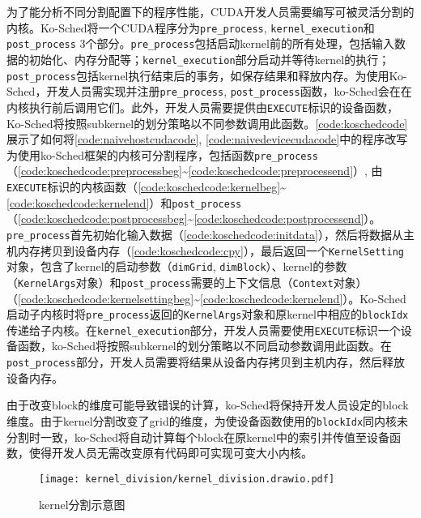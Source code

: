 为了能分析不同分割配置下的程序性能，CUDA开发人员需要编写可被灵活分割的内核。Ko-Sched将一个CUDA程序分为\texttt{pre\_process}, \texttt{kernel\_execution}和\texttt{post\_process} 3个部分。\texttt{pre\_process}包括启动kernel前的所有处理，包括输入数据的初始化、内存分配等；\texttt{kernel\_execution}部分启动并等待kernel的执行；\texttt{post\_process}包括kernel执行结束后的事务，如保存结果和释放内存。为使用Ko-Sched，开发人员需实现并注册\texttt{pre\_process}, \texttt{post\_process}函数，ko-Sched会在在内核执行前后调用它们。此外，开发人员需要提供由\texttt{EXECUTE}标识的设备函数，Ko-Sched将按照subkernel的划分策略以不同参数调用此函数。\autoref{code:koschedcode}展示了如何将\autoref{code:naivehostcudacode}, \autoref{code:naivedevicecudacode}中的程序改写为使用ko-Sched框架的内核可分割程序，包括函数\texttt{pre\_process}（\autoref{code:koschedcode:preprocessbeg}\textasciitilde\autoref{code:koschedcode:preprocessend}）, 由\texttt{EXECUTE}标识的内核函数（\autoref{code:koschedcode:kernelbeg}\textasciitilde\autoref{code:koschedcode:kernelend}）和\texttt{post\_process}（\autoref{code:koschedcode:postprocessbeg}\textasciitilde\autoref{code:koschedcode:postprocessend}）。\texttt{pre\_process}首先初始化输入数据（\autoref{code:koschedcode:initdata}），然后将数据从主机内存拷贝到设备内存（\autoref{code:koschedcode:cpy}），最后返回一个\texttt{KernelSetting}对象，包含了kernel的启动参数（\texttt{dimGrid}, \texttt{dimBlock}）、kernel的参数（\texttt{KernelArgs}对象）和\texttt{post\_process}需要的上下文信息（\texttt{Context}对象）（\autoref{code:koschedcode:kernelsettingbeg}\textasciitilde\autoref{code:koschedcode:kernelend}）。Ko-Sched启动子内核时将\texttt{pre\_process}返回的\texttt{KernelArgs}对象和原kernel中相应的\texttt{blockIdx}传递给子内核。在\texttt{kernel\_execution}部分，开发人员需要使用\texttt{EXECUTE}标识一个设备函数，ko-Sched将按照subkernel的划分策略以不同启动参数调用此函数。在\texttt{post\_process}部分，开发人员需要将结果从设备内存拷贝到主机内存，然后释放设备内存。

由于改变block的维度可能导致错误的计算，ko-Sched将保持开发人员设定的block维度。由于kernel分割改变了grid的维度，为使设备函数使用的\texttt{blockIdx}同内核未分割时一致，ko-Sched将自动计算每个block在原kernel中的索引并传值至设备函数，使得开发人员无需改变原有代码即可实现可变大小内核。

\begin{figure}[htbp]
    \centering
    \texttt{[image: kernel\_division/kernel\_division.drawio.pdf]}
    \caption{kernel分割示意图}
    \label{kernel-division}
\end{figure}

